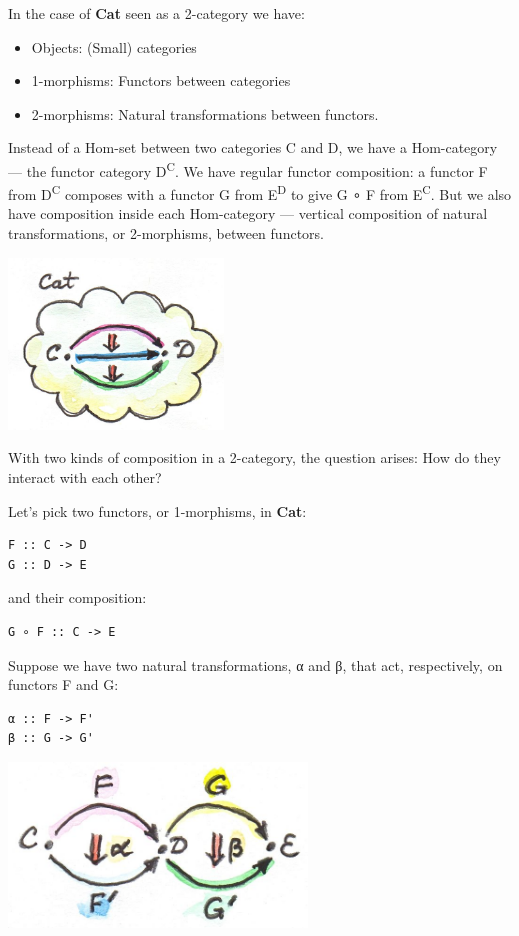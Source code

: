 In the case of \textbf{Cat} seen as a 2-category we have:

\begin{itemize}
\tightlist
\item
  Objects: (Small) categories
\item
  1-morphisms: Functors between categories
\item
  2-morphisms: Natural transformations between functors.
\end{itemize}

Instead of a Hom-set between two categories C and D, we have a
Hom-category --- the functor category D\textsuperscript{C}. We have
regular functor composition: a functor F from D\textsuperscript{C}
composes with a functor G from E\textsuperscript{D} to give G ∘ F from
E\textsuperscript{C}. But we also have composition inside each
Hom-category --- vertical composition of natural transformations, or
2-morphisms, between functors.

\includegraphics[width=2.25000in]{images/8_cat-2-cat.jpg}

With two kinds of composition in a 2-category, the question arises: How
do they interact with each other?

Let's pick two functors, or 1-morphisms, in \textbf{Cat}:

\begin{verbatim}
F :: C -> D
G :: D -> E
\end{verbatim}

and their composition:

\begin{verbatim}
G ∘ F :: C -> E
\end{verbatim}

Suppose we have two natural transformations, α and β, that act,
respectively, on functors F and G:

\begin{verbatim}
α :: F -> F'
β :: G -> G'
\end{verbatim}

\includegraphics[width=3.12500in]{images/10_horizontal.jpg}

